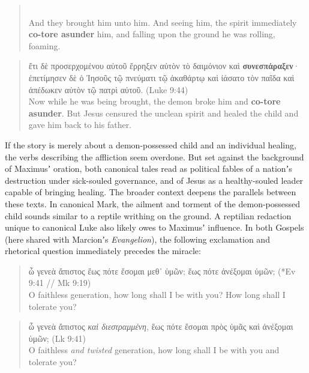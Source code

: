  \vspace*{2mm} 
  \begin{quote} \\[0.4mm] %
 And they brought him unto him. %
 And seeing him, the spirit immediately \textbf{co-tore asunder} him, %
 and falling upon the ground he was rolling, foaming. \end{quote} %
  \vspace*{2mm}
 \begin{quote} ἔτι δὲ προσερχομένου αὐτοῦ ἔρρηξεν αὐτὸν τὸ δαιμόνιον καὶ \textbf{συνεσπάραξεν}· %
  ἐπετίμησεν δὲ ὁ Ἰησοῦς τῷ πνεύματι τῷ ἀκαθάρτῳ καὶ %
  ἰάσατο τὸν παῖδα καὶ ἀπέδωκεν αὐτὸν τῷ πατρὶ αὐτοῦ. (Luke 9:44) \\[0.4mm] %
 Now while he was being brought, the demon broke him and \textbf{co-tore asunder}. %
 But Jesus censured the unclean spirit and %
 healed the child and gave him back to his father. \end{quote} %
 \vspace*{2mm}

If the story is merely about a demon-possessed child and an individual healing, %
the verbs describing the affliction seem overdone. %
But set against the background of Maximusʼ oration, %
both canonical tales read as political fables of a nationʼs destruction under sick-souled governance, %
and of Jesus as a healthy-souled leader capable of bringing healing. %
The broader context deepens the parallels between these texts. %
In canonical Mark, the ailment and torment of the demon-possessed child sounds %
similar to a reptile writhing on the ground. %
A reptilian redaction unique to canonical Luke also likely owes to Maximusʼ influence. %
In both Gospels (here shared with Marcionʼs \textit{Evangelion}), the following exclamation and rhetorical question %
immediately precedes the miracle: \clearpage %

\begin{quote}ὦ γενεὰ ἄπιστος ἕως πότε ἔσομαι μεθ᾽ ὑμῶν; ἕως πότε ἀνέξομαι ὑμῶν; (*Ev 9:41 // Mk 9:19) \\[0.4mm] %
O faithless generation, how long shall I be with you? How long shall I tolerate you?\end{quote} %
\vspace*{2mm} 
\begin{quote}ὦ γενεὰ ἄπιστος \textit{καὶ διεστραμμένη}, ἕως πότε ἔσομαι πρὸς ὑμᾶς καὶ ἀνέξομαι ὑμῶν; (Lk 9:41) \\[0.4mm] %
O faithless \textit{and twisted} generation, how long shall I be with you and tolerate you? \end{quote} %
\vspace*{2mm}


